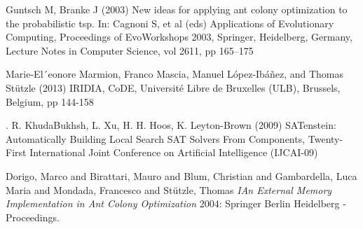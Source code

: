 \documentclass[12pt]{article}
\begin{document}
\begin{thebibliography}{1}
 Guntsch M, Branke J (2003) New ideas for applying ant colony optimization to the probabilistic tsp. In: Cagnoni S, et al (eds) Applications of Evolutionary Computing, Proceedings of EvoWorkshops 2003, Springer, Heidelberg, Germany, Lecture Notes in Computer Science, vol 2611, pp 165–175

 Marie-El´eonore Marmion, Franco Mascia,
Manuel L{\'o}pez-Ib{\'a}{\~n}ez, and Thomas St{\"u}tzle (2013) IRIDIA, CoDE, Universit{\'e} Libre de Bruxelles (ULB), Brussels, Belgium, pp 144-158

 . R. KhudaBukhsh, L. Xu, H. H. Hoos, K. Leyton-Brown (2009) SATenstein: Automatically Building Local Search SAT Solvers From Components, Twenty-First International Joint Conference on Artificial Intelligence (IJCAI-09)

 
 Dorigo, Marco
and Birattari, Mauro
and Blum, Christian
and Gambardella, Luca Maria
and Mondada, Francesco
and St{\"u}tzle, Thomas {\em IAn External Memory Implementation in Ant Colony Optimization} 2004: Springer Berlin Heidelberg - Proceedings.

\end{thebibliography}

 
\end{document}
